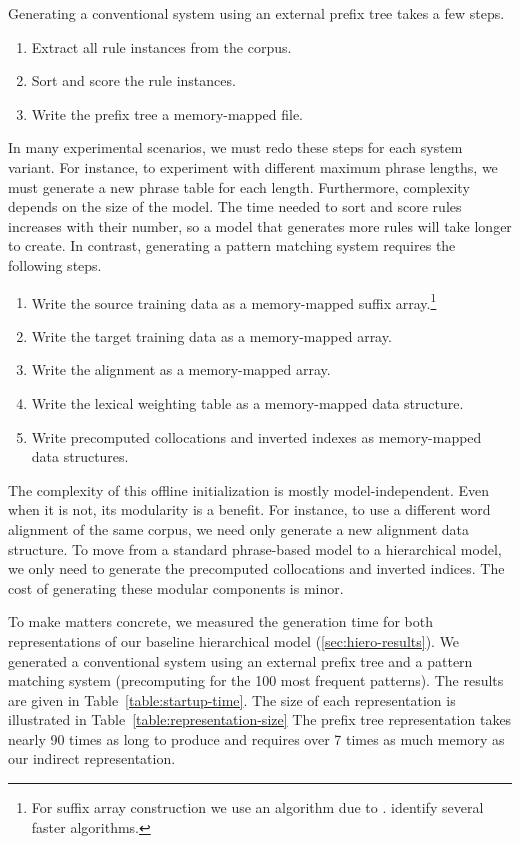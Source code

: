 Generating a conventional system using an external prefix tree 
\citep{Zens:2007:hlt-naacl} takes a few steps.

\begin{enumerate}
	\item Extract all rule instances from the corpus.
	\item Sort and score the rule instances.
	\item Write the prefix tree a memory-mapped file.
\end{enumerate}

\noindent In many experimental scenarios, we must redo these steps for
each system variant.  For instance, to experiment with different maximum
phrase lengths, we must generate a new phrase table for each length.
Furthermore, complexity depends on the size of 
the model.  The time needed to sort and score rules increases with
their number, so a model that generates more rules will take longer
to create.  In contrast, generating a pattern matching system requires the following
steps.

\begin{enumerate}
	\item Write the source training data as a memory-mapped suffix array.\footnote{For 
		suffix array construction we use an algorithm due to 
		\citet{Larsson:1999:tr}. \citet{Puglisi:2007:csur} 
		identify several faster algorithms.}
	\item Write the target training data as a memory-mapped array.
	\item Write the alignment as a memory-mapped array.
	\item Write the lexical weighting table as a memory-mapped data structure.
	\item Write precomputed collocations and inverted indexes as memory-mapped data structures.
\end{enumerate}

\noindent The complexity of this offline initialization is mostly
model-independent.  Even when it is not, its modularity is a benefit.
For instance, to use a different word alignment of the same
corpus, we need only generate a new alignment data structure.  To move
from a standard phrase-based model to a hierarchical model, we only
need to generate the precomputed collocations and inverted indices.
The cost of generating these modular components is minor.

To make matters concrete, we measured the generation time for both representations of our
baseline hierarchical model (\textsection\ref{sec:hiero-results}).
We generated a conventional system using an external prefix tree and a pattern
matching system (precomputing for the 100 most frequent patterns).  The
results are given in Table~\ref{table:startup-time}.  The size of
each representation is illustrated in Table~\ref{table:representation-size}
The prefix tree representation takes nearly 90 times as long to produce
and requires over 7 times as much memory as our indirect representation.

